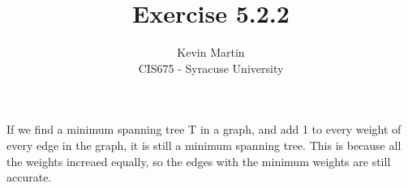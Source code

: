 \documentclass{article}
\author{Kevin Martin\\ CIS675 - Syracuse University}
\title{Exercise 5.2.2}
\begin{document}
\maketitle
If we find a minimum spanning tree T in a graph, and add 1 to
every weight of every edge in the graph, it is still a minimum
spanning tree. This is because all the weights increaed 
equally, so the edges with the minimum weights are still accurate.
\end{document}
